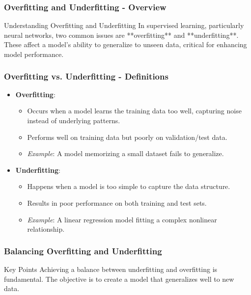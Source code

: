 \documentclass[aspectratio=169]{beamer}
\begin{document}
\begin{frame}[fragile]
  \frametitle{Overfitting and Underfitting - Overview}
  \begin{block}{Understanding Overfitting and Underfitting}
    In supervised learning, particularly neural networks, two common issues are **overfitting** and **underfitting**. 
    These affect a model's ability to generalize to unseen data, critical for enhancing model performance.
  \end{block}
\end{frame}

\begin{frame}[fragile]
  \frametitle{Overfitting vs. Underfitting - Definitions}
  \begin{itemize}
    \item \textbf{Overfitting}: 
      \begin{itemize}
        \item Occurs when a model learns the training data too well, capturing noise instead of underlying patterns.
        \item Performs well on training data but poorly on validation/test data.
        \item \textit{Example}: A model memorizing a small dataset fails to generalize.
      \end{itemize}
  
    \item \textbf{Underfitting}: 
      \begin{itemize}
        \item Happens when a model is too simple to capture the data structure.
        \item Results in poor performance on both training and test sets.
        \item \textit{Example}: A linear regression model fitting a complex nonlinear relationship.
      \end{itemize}
  \end{itemize}
\end{frame}

\begin{frame}[fragile]
  \frametitle{Balancing Overfitting and Underfitting}
  \begin{block}{Key Points}
    Achieving a balance between underfitting and overfitting is fundamental. 
    The objective is to create a model that generalizes well to new data.
  \end{block}
\end{frame}
\end{document}
